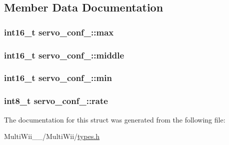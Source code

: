 \subsection{Member Data Documentation}
\hypertarget{structservo__conf___ae9cc648469a2047112b7f8c1d5aa48de}{
\subsubsection[{max}]{\setlength{\rightskip}{0pt plus 5cm}int16\-\_\-t servo\-\_\-conf\-\_\-\-::max}}\label{structservo__conf___ae9cc648469a2047112b7f8c1d5aa48de}
\hypertarget{structservo__conf___a59045c524c87263a1b4530015dd84b54}{
\subsubsection[{middle}]{\setlength{\rightskip}{0pt plus 5cm}int16\-\_\-t servo\-\_\-conf\-\_\-\-::middle}}\label{structservo__conf___a59045c524c87263a1b4530015dd84b54}
\hypertarget{structservo__conf___a61bf60f37499f4d6b2ca3a38564eb8a1}{
\subsubsection[{min}]{\setlength{\rightskip}{0pt plus 5cm}int16\-\_\-t servo\-\_\-conf\-\_\-\-::min}}\label{structservo__conf___a61bf60f37499f4d6b2ca3a38564eb8a1}
\hypertarget{structservo__conf___ab2c11761622958a841cd6a4148e133e8}{
\subsubsection[{rate}]{\setlength{\rightskip}{0pt plus 5cm}int8\-\_\-t servo\-\_\-conf\-\_\-\-::rate}}\label{structservo__conf___ab2c11761622958a841cd6a4148e133e8}


The documentation for this struct was generated from the following file\-:\begin{DoxyCompactItemize}
\item 
Multi\-Wii\-\_\-\_/\-Multi\-Wii/\hyperlink{MultiWii__2__4_2MultiWii_2types_8h}{types.\-h}\end{DoxyCompactItemize}
